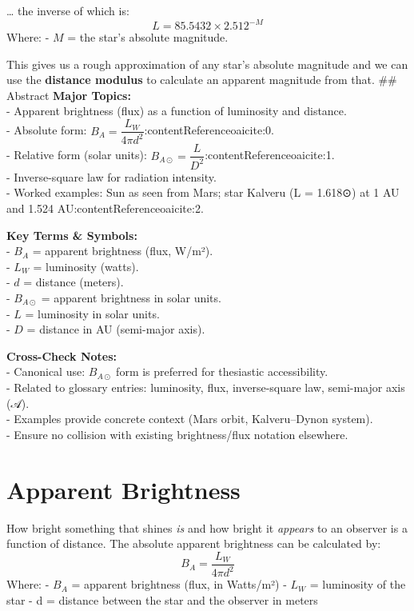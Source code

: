 \documentclass[
  letterpaper,
]{book}
\begin{document}
\ldots{} the inverse of which is: \[
L = 85.5432 \times 2.512^{-M}
\] Where: - \(M\) = the star's absolute magnitude.

This gives us a rough approximation of any star's absolute magnitude and
we can use the \textbf{distance modulus} to calculate an apparent
magnitude from that. \#\# Abstract \textbf{Major Topics:}\\
- Apparent brightness (flux) as a function of luminosity and distance.\\
- Absolute form:
\(B_A = \dfrac{L_W}{4 \pi d^2}\):contentReference{oaicite:0}.\\
- Relative form (solar units):
\(B_{A⊙} = \dfrac{L}{D^2}\):contentReference{oaicite:1}.\\
- Inverse-square law for radiation intensity.\\
- Worked examples: Sun as seen from Mars; star Kalveru (L = 1.618⊙) at 1
AU and 1.524 AU:contentReference{oaicite:2}.

\textbf{Key Terms \& Symbols:}\\
- \(B_A\) = apparent brightness (flux, W/m²).\\
- \(L_W\) = luminosity (watts).\\
- \(d\) = distance (meters).\\
- \(B_{A⊙}\) = apparent brightness in solar units.\\
- \(L\) = luminosity in solar units.\\
- \(D\) = distance in AU (semi-major axis).

\textbf{Cross-Check Notes:}\\
- Canonical use: \(B_{A⊙}\) form is preferred for thesiastic
accessibility.\\
- Related to glossary entries: luminosity, flux, inverse-square law,
semi-major axis (𝒜).\\
- Examples provide concrete context (Mars orbit, Kalveru--Dynon
system).\\
- Ensure no collision with existing brightness/flux notation elsewhere.

\chapter{Apparent Brightness}\label{apparent-brightness}

How bright something that shines \emph{is} and how bright it
\emph{appears} to an observer is a function of distance. The absolute
apparent brightness can be calculated by: \[
B_A = \dfrac{L_W}{4 \pi d^2}
\] Where: - \(B_A\) = apparent brightness (flux, in Watts/m²) - \(L_W\)
= luminosity of the star - d = distance between the star and the
observer in meters
\end{document}
